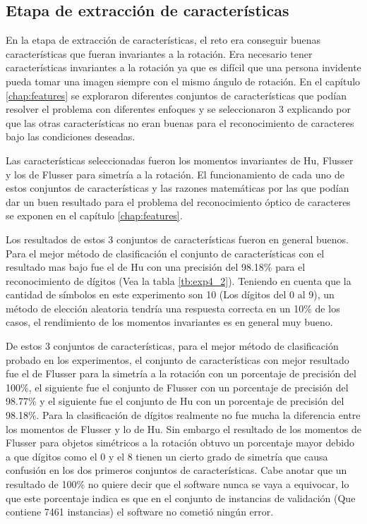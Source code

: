 \documentclass[a4paper, 11pt, oneside]{report}
\begin{document}
\subsection{Etapa de extracción de características}
En la etapa de extracción de características, el reto era conseguir buenas características que fueran invariantes a la rotación. Era necesario tener características invariantes a la rotación ya que es difícil que una persona invidente pueda tomar una imagen siempre con el mismo ángulo de rotación. En el capítulo \ref{chap:features} se exploraron diferentes conjuntos de características que podían resolver el problema con diferentes enfoques y se seleccionaron 3 explicando por que las otras características no eran buenas para el reconocimiento de caracteres bajo las condiciones deseadas. 

Las características seleccionadas fueron los momentos invariantes de Hu, Flusser y los de Flusser para simetría a la rotación. El funcionamiento de cada uno de estos conjuntos de características y las razones matemáticas por las que podían dar un buen resultado para el problema del reconocimiento óptico de caracteres se exponen en el capítulo \ref{chap:features}.

Los resultados de estos 3 conjuntos de características fueron en general buenos. Para el mejor método de clasificación el conjunto de características con el resultado mas bajo fue el de Hu con una precisión del 98.18\% para el reconocimiento de dígitos (Vea la tabla \ref{tb:exp4_2}). Teniendo en cuenta que la cantidad de símbolos en este experimento son 10 (Los dígitos del 0 al 9), un método de elección aleatoria tendría una respuesta correcta en un 10\% de los casos, el rendimiento de los momentos invariantes es en general muy bueno.

De estos 3 conjuntos de características, para el mejor método de clasificación probado en los experimentos, el conjunto de características con mejor resultado fue el de Flusser para la simetría a la rotación con un porcentaje de precisión del 100\%, el siguiente fue el conjunto de Flusser con un porcentaje de precisión del 98.77\% y el siguiente fue el conjunto de Hu con un porcentaje de precisión del 98.18\%. Para la clasificación de dígitos realmente no fue mucha la diferencia entre los momentos de Flusser y lo de Hu. Sin embargo el resultado de los momentos de Flusser para objetos simétricos a la rotación obtuvo un porcentaje mayor debido a que dígitos como el 0 y el 8 tienen un cierto grado de simetría que causa confusión en los dos primeros conjuntos de características. Cabe anotar que un resultado de 100\% no quiere decir que el software nunca se vaya a equivocar, lo que este porcentaje indica es que en el conjunto de instancias de validación (Que contiene 7461 instancias) el software no cometió ningún error. 
\end{document}
